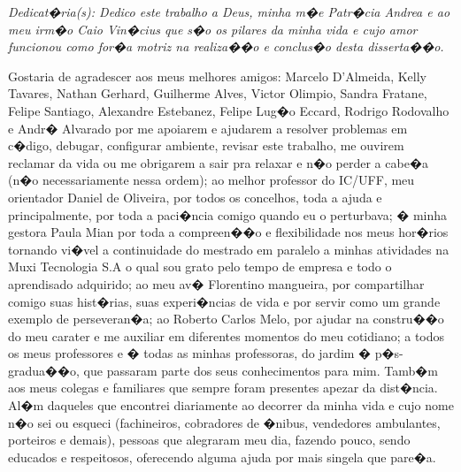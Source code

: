 \cleardoublepage
\thispagestyle{empty}
\vspace*{200mm}

\begin{flushright}
{\em 
Dedicat�ria(s): Dedico este trabalho a Deus, minha m�e Patr�cia Andrea e ao meu irm�o Caio Vin�cius que s�o os pilares da minha vida e cujo amor funcionou como for�a motriz na realiza��o e conclus�o desta disserta��o.
}
\end{flushright}
\newpage


\hspace{5mm}
Gostaria de agradescer aos meus melhores amigos: Marcelo D'Almeida, Kelly Tavares, Nathan Gerhard, Guilherme Alves, Victor Olimpio, Sandra Fratane, Felipe Santiago, Alexandre Estebanez, Felipe Lug�o Eccard, Rodrigo Rodovalho e Andr� Alvarado por me apoiarem e ajudarem a resolver problemas em c�digo, debugar, configurar ambiente, revisar este trabalho, me ouvirem reclamar da vida ou me obrigarem a sair pra relaxar e n�o perder a cabe�a (n�o necessariamente nessa ordem); ao melhor professor do IC/UFF, meu orientador Daniel de Oliveira, por todos os concelhos, toda a ajuda e principalmente, por toda a paci�ncia comigo quando eu o perturbava; � minha gestora Paula Mian por toda a compreen��o e flexibilidade nos meus hor�rios tornando vi�vel a continuidade do mestrado em paralelo a minhas atividades na Muxi Tecnologia S.A o qual sou grato pelo tempo de empresa e todo o aprendisado adquirido; ao meu av� Florentino mangueira, por compartilhar comigo suas hist�rias, suas experi�ncias de vida e por servir como um grande exemplo de perseveran�a; ao Roberto Carlos Melo, por ajudar na constru��o do meu carater e me auxiliar em diferentes momentos do meu cotidiano; a todos os meus professores e � todas as minhas professoras, do jardim � p�s-gradua��o, que passaram parte dos seus conhecimentos para mim. Tamb�m aos meus colegas e familiares que sempre foram presentes apezar da dist�ncia. Al�m daqueles que encontrei diariamente ao decorrer da minha vida e cujo nome n�o sei ou esqueci (fachineiros, cobradores de �nibus, vendedores ambulantes, porteiros e demais), pessoas que alegraram meu dia, fazendo pouco, sendo educados e respeitosos, oferecendo alguma ajuda por mais singela que pare�a.

